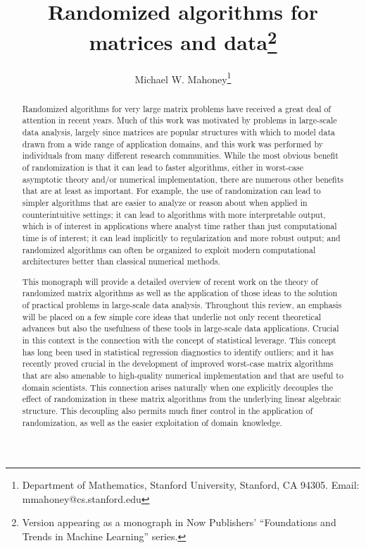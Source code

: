 \documentclass[twoside]{article}
\begin{document}
\title{
Randomized algorithms for matrices and data\footnote{Version appearing as a monograph in Now Publishers' ``Foundations and Trends in Machine Learning'' series.}
}

\author{
Michael W. Mahoney\thanks{
Department of Mathematics, 
Stanford University, 
Stanford, CA 94305. 
Email: mmahoney@cs.stanford.edu
}
}

\date{}
\maketitle

\begin{center}
{\bf
}
\end{center}
\vspace{-0.25in}

\begin{abstract}
Randomized algorithms for very large matrix problems have received a great 
deal of attention in recent years.
Much of this work was motivated by problems in large-scale data analysis, 
largely since matrices are popular structures with which to model data drawn 
from a wide range of application domains, and this work was performed by 
individuals from many different research communities.
While the most obvious benefit of randomization is that it can lead to 
faster algorithms, either in worst-case asymptotic theory and/or numerical 
implementation, there are numerous other benefits that are at least as 
important.
For example, the use of randomization can lead to simpler algorithms that 
are easier to analyze or reason about when applied in counterintuitive 
settings; it can lead to algorithms with more interpretable output, which is 
of interest in applications where analyst time rather than just 
computational time is of interest; it can lead implicitly to regularization 
and more robust output; and randomized algorithms can often be organized to 
exploit modern computational architectures better than classical numerical 
methods.

This monograph will provide a detailed overview of recent work on the theory 
of randomized matrix algorithms as well as the application of those 
ideas to the solution of practical problems in large-scale data analysis.
Throughout this review, an emphasis will be placed on a few simple core 
ideas that underlie not only recent theoretical advances but also the 
usefulness of these tools in large-scale data applications.
Crucial in this context is the connection with the concept of statistical 
leverage.
This concept has long been used in statistical regression diagnostics to 
identify outliers; and it has recently proved crucial in the development 
of improved worst-case matrix algorithms that are also amenable to 
high-quality numerical implementation and that are useful to domain 
scientists.
This connection arises naturally when one explicitly decouples the effect 
of randomization in these matrix algorithms from the underlying linear
algebraic structure.  This decoupling also permits much finer control in the 
application of randomization, as well as the easier exploitation of 
domain~knowledge.


\end{abstract}
\end{document}
